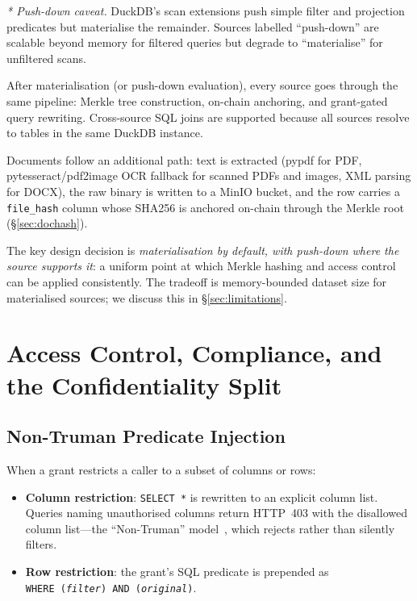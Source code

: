 \documentclass[10pt,twocolumn]{article}
\begin{document}
\smallskip
\noindent
\emph{* Push-down caveat.} DuckDB's scan extensions push simple
filter and projection predicates but materialise the remainder.
Sources labelled ``push-down'' are scalable beyond memory for
filtered queries but degrade to ``materialise'' for unfiltered
scans.

After materialisation (or push-down evaluation), every source goes
through the same pipeline: Merkle tree construction, on-chain
anchoring, and grant-gated query rewriting. Cross-source SQL joins
are supported because all sources resolve to tables in the same
DuckDB instance.

Documents follow an additional path: text is extracted (pypdf for
PDF, pytesseract/pdf2image OCR fallback for scanned PDFs and
images, XML parsing for DOCX), the raw binary is written to a
MinIO bucket, and the row carries a \texttt{file\_hash} column
whose SHA256 is anchored on-chain through the Merkle root
(\S\ref{sec:dochash}).

The key design decision is \emph{materialisation by default, with
push-down where the source supports it}: a uniform point at which
Merkle hashing and access control can be applied consistently.
The tradeoff is memory-bounded dataset size for materialised
sources; we discuss this in \S\ref{sec:limitations}.


\section{Access Control, Compliance, and the Confidentiality Split}
\label{sec:access}

\subsection{Non-Truman Predicate Injection}

When a grant restricts a caller to a subset of columns or rows:

\begin{itemize}[leftmargin=*,topsep=3pt,itemsep=2pt]
\item \textbf{Column restriction}: \texttt{SELECT~*} is rewritten
  to an explicit column list. Queries naming unauthorised columns
  return HTTP~403 with the disallowed column list---the
  ``Non-Truman'' model~\cite{rizvi2004nontruman}, which rejects
  rather than silently filters.
\item \textbf{Row restriction}: the grant's SQL predicate is
  prepended as
  \texttt{WHERE~(\textit{filter})~AND~(\textit{original})}.
\end{itemize}
\end{document}
